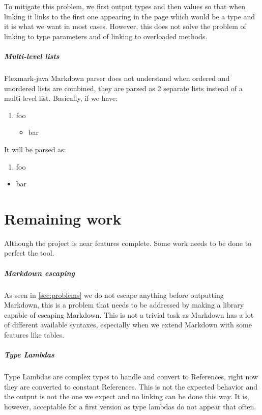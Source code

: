 \documentclass{report}
\begin{document}
To mitigate this problem, we first output types and then values so that when linking it links to the first one appearing in the page which would be a type and it is what we want in most cases. However, this does not solve the problem of linking to type parameters and of linking to overloaded methods.

\paragraph{Multi-level lists}
Flexmark-java Markdown parser does not understand when ordered and unordered lists are combined, they are parsed as 2 separate lists instead of a multi-level list. Basically, if we have:
\begin{enumerate}
    \item foo
    \begin{itemize}
        \item bar
    \end{itemize}
\end{enumerate}
It will be parsed as:
\begin{enumerate}
    \item foo
\end{enumerate}
\begin{itemize}
    \item bar
\end{itemize}

\chapter{Remaining work}
Although the project is near features complete. Some work needs to be done to perfect the tool.

\paragraph{Markdown escaping}
As seen in \autoref{sec:problems} we do not escape anything before outputting Markdown, this is a problem that needs to be addressed by making a library capable of escaping Markdown. This is not a trivial task as Markdown has a lot of different available syntaxes, especially when we extend Markdown with some features like tables.

\paragraph{Type Lambdas}
Type Lambdas are complex types to handle and convert to References, right now they are converted to constant References. This is not the expected behavior and the output is not the one we expect and no linking can be done this way. It is, however, acceptable for a first version as type lambdas do not appear that often.
\end{document}
